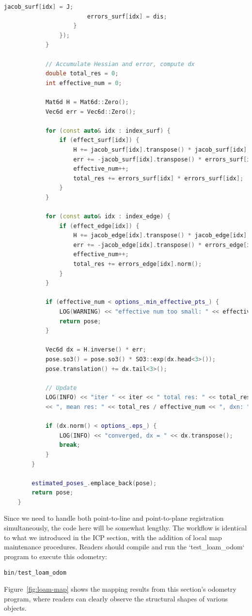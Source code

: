 \begin{lstlisting}[language=c++,caption=src/ch7/loam-like/loam\_like\_odom.cc]
						jacob_surf[idx] = J;
						errors_surf[idx] = dis;
					}
				});
			}
			
			// Accumulate Hessian and error, compute dx
			double total_res = 0;
			int effective_num = 0;
			
			Mat6d H = Mat6d::Zero();
			Vec6d err = Vec6d::Zero();
			
			for (const auto& idx : index_surf) {
				if (effect_surf[idx]) {
					H += jacob_surf[idx].transpose() * jacob_surf[idx];
					err += -jacob_surf[idx].transpose() * errors_surf[idx];
					effective_num++;
					total_res += errors_surf[idx] * errors_surf[idx];
				}
			}
			
			for (const auto& idx : index_edge) {
				if (effect_edge[idx]) {
					H += jacob_edge[idx].transpose() * jacob_edge[idx];
					err += -jacob_edge[idx].transpose() * errors_edge[idx];
					effective_num++;
					total_res += errors_edge[idx].norm();
				}
			}
			
			if (effective_num < options_.min_effective_pts_) {
				LOG(WARNING) << "effective num too small: " << effective_num;
				return pose;
			}
			
			Vec6d dx = H.inverse() * err;
			pose.so3() = pose.so3() * SO3::exp(dx.head<3>());
			pose.translation() += dx.tail<3>();
			
			// Update
			LOG(INFO) << "iter " << iter << " total res: " << total_res << ", eff: " << effective_num
			<< ", mean res: " << total_res / effective_num << ", dxn: " << dx.norm();
			
			if (dx.norm() < options_.eps_) {
				LOG(INFO) << "converged, dx = " << dx.transpose();
				break;
			}
		}
		
		estimated_poses_.emplace_back(pose);
		return pose;
	}
\end{lstlisting}

Since we need to handle both point-to-line and point-to-plane registration simultaneously, the code here will be somewhat lengthy. The workflow is identical to what we introduced in the ICP section, with the addition of local map maintenance procedures. Readers should compile and run the `test_loam_odom` program to execute this odometry:

\begin{lstlisting}[language=c++,caption=Terminal input:]
	bin/test_loam_odom 
\end{lstlisting}

Figure~\ref{fig:loam-map} shows the mapping results from this section's odometry program, where readers can clearly observe the structural shapes of various objects.


